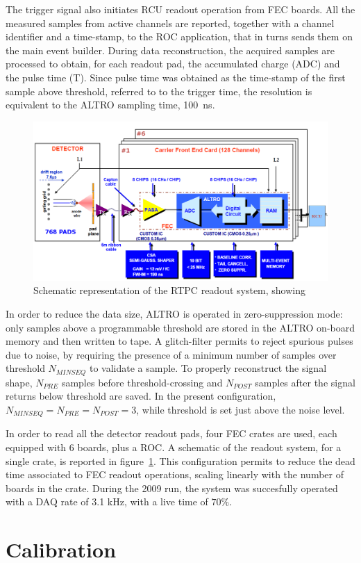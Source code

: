 \documentclass[twocolumn,showpacs,superscriptaddress,groupedaddress]{revtex4}
\begin{document}
The trigger signal also initiates RCU readout operation from FEC boards. All 
the measured samples from active channels are reported, together with a channel 
identifier and a time-stamp, to the ROC application, that in turns sends them 
on the main event builder. During data reconstruction, the acquired samples are 
processed to obtain, for each readout pad, the accumulated charge (ADC) and the 
pulse time (T). Since pulse time was obtained as the time-stamp of the first 
sample above threshold, referred to to the trigger time, the resolution is 
equivalent to the ALTRO sampling time, 100~ns.

\begin{figure}[tb]
   \centering
   \includegraphics[width=.45\textwidth]{fig/ReadoutScheme.png}
   \caption[]{Schematic representation of the RTPC readout system, showing} 
   \label{fig:ReadoutScheme}
\end{figure}

In order to reduce the data size, ALTRO is operated in zero-suppression mode: 
only samples above a programmable threshold are stored in the ALTRO on-board 
memory and then written to tape. A glitch-filter permits to reject spurious 
pulses due to noise, by requiring the presence of a minimum number of samples 
over threshold $N_{MINSEQ}$ to validate a sample. To properly reconstruct 
the signal shape, $N_{PRE}$ samples before threshold-crossing and $N_{POST}$ 
samples after the signal returns below threshold are saved. In the present 
configuration, $N_{MINSEQ}=N_{PRE}=N_{POST}=3$, while threshold is set just 
above the noise level. 

In order to read all the detector readout pads, four FEC crates are used, 
each equipped with 6 boards, plus a ROC. A schematic of the readout system, 
for a single crate, is reported in figure~\ref{fig:ReadoutScheme}. This 
configuration permits to reduce the dead time associated to FEC readout 
operations, scaling linearly with the number of boards in the crate. During 
the 2009 run, the system was succesfully operated with a DAQ rate of 3.1 kHz, 
with a live time of $70 \%$.

\section{Calibration} \label{sec_calib}
\end{document}
